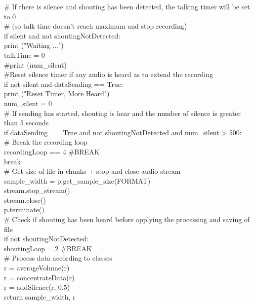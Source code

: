 \documentclass[a4paper,11pt]{report}
\begin{document}
            \# If there is silence and shouting has been detected, the talking timer will be set to 0\\
            \# (so talk time doesn't reach maximum and stop recording)\\
            if silent and not shoutingNotDetected:\\
                print ("Waiting ...")\\
                talkTime = 0\\
                \#print (num\_silent)   \\

            \#Reset silence timer if any audio is heard as to extend the recording\\
            if not silent and dataSending == True:\\
                print ("Reset Timer, More Heard") \\
                num\_silent = 0\\

            \# If sending has started, shouting is hear and the number of silence is greater than 5 seconds\\
            if dataSending == True and not shoutingNotDetected and num\_silent > 500:\\
                \# Break the recording loop\\
                recordingLoop == 4 \#BREAK\\
                break    \\
        
        \# Get size of file in chunks + stop and close audio stream\\
        sample\_width = p.get\_sample\_size(FORMAT)\\
        stream.stop\_stream()\\
        stream.close()\\
        p.terminate()\\
        
        \# Check if shouting has been heard before applying the processing and saving of file\\
        if not shoutingNotDetected:\\
            shoutingLoop = 2 \#BREAK\\

    \# Process data according to classes\\
    r = averageVolume(r)\\
    r = concentrateData(r)    \\
    r = addSilence(r, 0.5)\\
    return sample\_width, r\\
\end{document}
